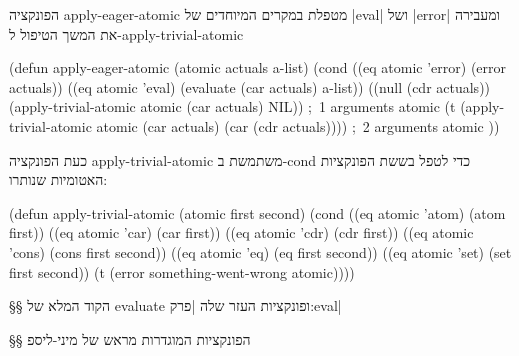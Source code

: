 הפונקציה apply-eager-atomic מטפלת במקרים המיוחדים של \E|eval| ושל \E|error|
ומעבירה את המשך הטיפול ל-apply-trivial-atomic
\begin{KERNEL}
(defun apply-eager-atomic (atomic actuals a-list)
  (cond
    ((eq atomic 'error) (error actuals))
    ((eq atomic 'eval) (evaluate (car actuals) a-list))
    ((null (cdr actuals)) (apply-trivial-atomic atomic (car actuals) NIL)) ;~1 arguments atomic
    (t (apply-trivial-atomic atomic (car actuals) (car (cdr actuals)))) ;~2 arguments atomic
))
\end{KERNEL}

כעת הפונקציה apply-trivial-atomic משתמשת ב-cond כדי לטפל בששת הפונקציות האטומיות שנותרו:
\begin{KERNEL}
(defun apply-trivial-atomic (atomic first second)
  (cond ((eq atomic 'atom) (atom first))
        ((eq atomic 'car) (car first))
        ((eq atomic 'cdr) (cdr first))
        ((eq atomic 'cons) (cons first second))
        ((eq atomic 'eq) (eq first second))
        ((eq atomic 'set) (set first second))
        (t (error something-went-wrong atomic))))
\end{KERNEL}

§§ הקוד המלא של evaluate ופונקציות העזר שלה
|פרק:eval|

\immediate \closeout {}
\begin{LTR}
  
\end{LTR}

§§ הפונקציות המוגדרות מראש של מיני-ליספ


